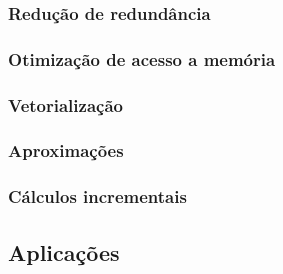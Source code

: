 \subsubsection{Redução de redundância} \label{time-redund}
\subsubsection{Otimização de acesso a memória} \label{time-access}
\subsubsection{Vetorialização} \label{time-vect}
\subsubsection{Aproximações} \label{time-approx}
\subsubsection{Cálculos incrementais} \label{time-dist}


\subsection{Aplicações} \label{applications}

